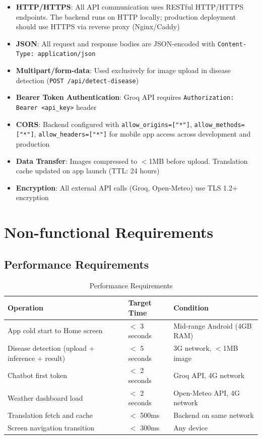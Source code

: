 \documentclass[12pt,a4paper]{article}
\newcommand{\tablefont}{\fontsize{10}{12}\selectfont}
\begin{document}
\begin{itemize}
    \item \textbf{HTTP/HTTPS}: All API communication uses RESTful HTTP/HTTPS endpoints. The backend runs on HTTP locally; production deployment should use HTTPS via reverse proxy (Nginx/Caddy)
    \item \textbf{JSON}: All request and response bodies are JSON-encoded with \texttt{Content-Type: application/json}
    \item \textbf{Multipart/form-data}: Used exclusively for image upload in disease detection (\texttt{POST /api/detect-disease})
    \item \textbf{Bearer Token Authentication}: Groq API requires \texttt{Authorization: Bearer <api\_key>} header
    \item \textbf{CORS}: Backend configured with \texttt{allow\_origins=["*"]}, \texttt{allow\_methods=["*"]}, \texttt{allow\_headers=["*"]} for mobile app access across development and production
    \item \textbf{Data Transfer}: Images compressed to $<$1MB before upload. Translation cache updated on app launch (TTL: 24 hours)
    \item \textbf{Encryption}: All external API calls (Groq, Open-Meteo) use TLS 1.2+ encryption
\end{itemize}

\section{Non-functional Requirements}

\subsection{Performance Requirements}

\begin{table}[H]
\centering
\tablefont
\begin{tabular}{|p{5cm}|p{3cm}|p{4cm}|}
\hline
\textbf{Operation} & \textbf{Target Time} & \textbf{Condition} \\
\hline
App cold start to Home screen & $<$ 3 seconds & Mid-range Android (4GB RAM) \\
Disease detection (upload + inference + result) & $<$ 5 seconds & 3G network, $<$1MB image \\
Chatbot first token & $<$ 2 seconds & Groq API, 4G network \\
Weather dashboard load & $<$ 2 seconds & Open-Meteo API, 4G network \\
Translation fetch and cache & $<$ 500ms & Backend on same network \\
Screen navigation transition & $<$ 300ms & Any device \\
\hline
\end{tabular}
\caption{Performance Requirements}
\end{table}
\end{document}
